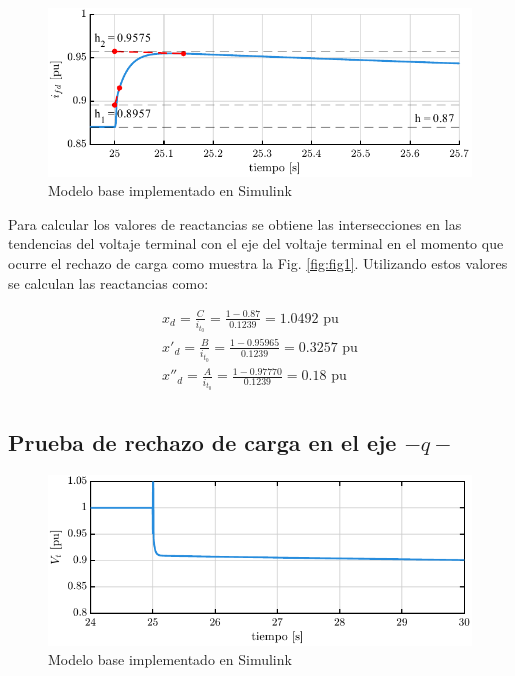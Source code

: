 \documentclass[conference]{IEEEtran}
\begin{document}
\begin{figure}[ht]
    \centering
    \includegraphics[width=\linewidth]{Fig/fig2.pdf}
    \caption{Modelo base implementado en Simulink}
    \label{fig:fig2}
\end{figure}

Para calcular los valores de reactancias se obtiene las intersecciones en las tendencias del
voltaje terminal con el eje del voltaje terminal en el momento que ocurre el rechazo de carga
como muestra la Fig. \ref{fig:fig1}. Utilizando estos valores se calculan las reactancias como:

\begin{gather*}
x_d = \frac{C}{i_{t_0}} = \frac{1 - 0.87}{0.1239} = 1.0492\text{ pu} \\
x'_{d} = \frac{B}{i_{t_0}} = \frac{1 - 0.95965}{0.1239} = 0.3257\text{ pu}\\
x''_{d} = \frac{A}{i_{t_0}} = \frac{1 - 0.97770}{0.1239} = 0.18\text{ pu}\\
\end{gather*}

\subsection{Prueba de rechazo de carga en el eje $-q-$}

\begin{figure}[ht]
    \centering
    \includegraphics[width=\linewidth]{Fig/fig3.pdf}
    \caption{Modelo base implementado en Simulink}
    \label{fig:fig3}
\end{figure}
\end{document}
